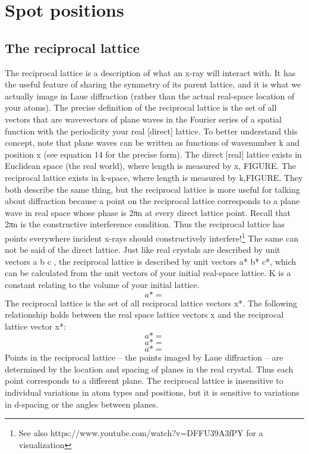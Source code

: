 \section{Spot positions}
\subsection{The reciprocal lattice}
The reciprocal lattice is a description of what an x-ray will interact with. It has the useful feature of sharing the symmetry of its parent lattice, and it is what we actually image in Laue diffraction (rather than the actual real-space location of your atoms). The precise definition of the reciprocal lattice is the set of all vectors that are wavevectors of plane waves in the Fourier series of a spatial function with the periodicity your real [direct] lattice.
To better understand this concept, note that plane waves can be written as functions of wavenumber k and position x (see equation 14 for the precise form). The direct [real] lattice exists in Euclidean space (the real world), where length is measured by x, FIGURE. The reciprocal lattice exists in k-space, where length is measured by k,FIGURE. They both describe the same thing, but the reciprocal lattice is more useful for talking about diffraction because a point on the reciprocal lattice corresponds to a plane wave in real space whose phase is 2πn at every direct lattice point. Recall that 2πn is the constructive interference condition. Thus the reciprocal lattice has points everywhere incident x-rays should constructively interfere!\footnote{See also https://www.youtube.com/watch?v=DFFU39A3fPY for a visualization} The same can not be said of the direct lattice.
Just like real crystals are described by unit vectors a b c , the reciprocal lattice is described by unit vectors a* b* c*, which can be calculated from the unit vectors of your initial real-space lattice. K is a constant relating to the volume of your initial lattice.
\begin{equation}
    a*=
    \label{RecipLatVecs}
\end{equation}
The reciprocal lattice is the set of all reciprocal lattice vectors x*. The following relationship holds between the real space lattice vectors x and the reciprocal lattice vector x*:
\begin{equation}
    a*=
    \label{RecipLatVecX}
\end{equation}
\begin{equation}
    a*=
    \label{RealLatVecX}
\end{equation}
\begin{equation}
    a*=
    \label{RecipRealLatVecXRelation}
\end{equation}
Points in the reciprocal lattice – the points imaged by Laue diffraction – are determined by the location and spacing of planes in the real crystal. Thus each point corresponds to a different plane. The reciprocal lattice is insensitive to individual variations in atom types and positions, but it is sensitive to variations in d-spacing or the angles between planes.
